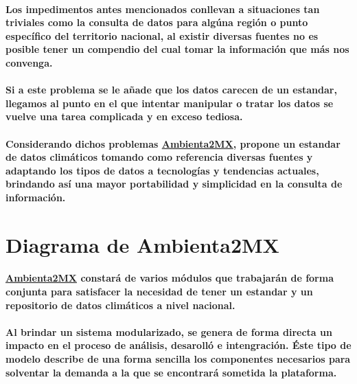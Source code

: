     \paragraph{Los impedimentos antes mencionados conllevan a situaciones tan triviales como la consulta de datos para algúna región o punto específico del territorio nacional, al existir diversas fuentes no es posible tener un compendio del cual tomar la información que más nos convenga.}
    \paragraph{Si a este problema se le añade que los datos carecen de un estandar, llegamos al punto en el que intentar manipular o tratar los datos se vuelve una tarea complicada y en exceso tediosa.}
    \paragraph{Considerando dichos problemas \underline{Ambienta2MX}, propone un estandar de datos climáticos tomando como referencia diversas fuentes y adaptando los tipos de datos a tecnologías y tendencias actuales, brindando así una mayor portabilidad y simplicidad en la consulta de información.}
  \newpage
  \section{Diagrama de Ambienta2MX}
    \paragraph{\underline{Ambienta2MX} constará de varios módulos que trabajarán de forma conjunta para satisfacer la necesidad de tener un estandar y un repositorio de datos climáticos a nivel nacional.}
    \paragraph{Al brindar un sistema modularizado, se genera de forma directa un impacto en el proceso de análisis, desarolló e intengración. Éste tipo de modelo describe de una forma sencilla los componentes necesarios para solventar la demanda a la que se encontrará sometida la plataforma.}
